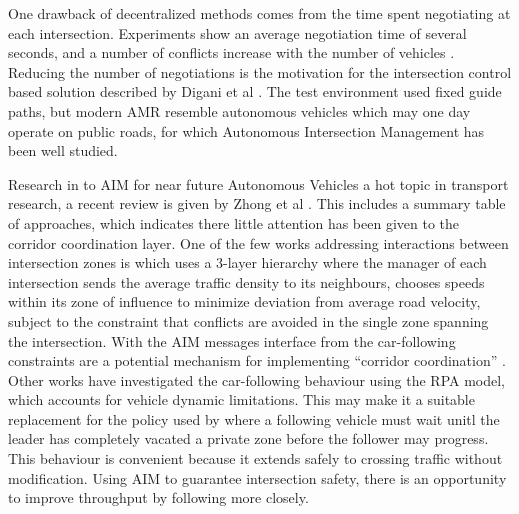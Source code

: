 \documentclass[runningheads]{llncs}
\begin{document}
One drawback of decentralized methods comes from the time spent negotiating at each intersection. Experiments show an average negotiation time of several seconds, and a number of conflicts increase with the number of vehicles \cite{Draganjac2020}. Reducing the number of negotiations is the motivation for the intersection control based solution described by Digani et al \cite{Digani2019}. The test environment used fixed guide paths, but modern AMR resemble autonomous vehicles which may one day operate on public roads, for which Autonomous Intersection Management has been well studied. 

Research in to AIM for near future Autonomous Vehicles a hot topic in transport research, a recent review is given by Zhong et al \cite{Zhong2020}. This includes a summary table of approaches, which indicates there little attention has been given to the corridor coordination layer.  One of the few works addressing interactions between intersection zones is \cite{Du2018} which uses a 3-layer hierarchy where the manager of each intersection sends the average traffic density to its neighbours, chooses speeds within its zone of influence to minimize deviation from average road velocity, subject to the constraint that conflicts are avoided in the single zone spanning the intersection. %
With the AIM messages interface from \cite{Levin2017} the car-following constraints are a potential mechanism for implementing ``corridor coordination'' . Other works have investigated the car-following behaviour \cite{Bichiou2019} using the RPA model, which accounts for vehicle dynamic limitations. This may make it a suitable replacement for the  policy used by \cite{Draganjac2020} where  a following vehicle must wait unitl the leader has completely vacated a private zone before the follower may progress. This behaviour is convenient because it extends safely to crossing traffic without modification. Using AIM to guarantee intersection safety, there is an opportunity to improve throughput by following more closely. 
 
\end{document}
